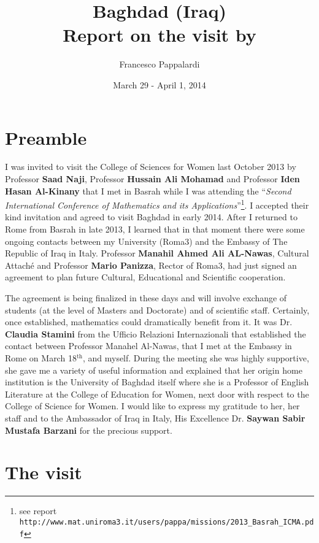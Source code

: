 \documentclass[12pt,a4paper]{scrartcl}
\title{Baghdad (Iraq)\\ Report on the visit by}
\author{Francesco Pappalardi}
\date{March 29 - April 1, 2014}
\begin{document}
\maketitle


\section{Preamble}

I was invited to visit the College of Sciences for Women last October 2013 by 
Professor \textbf{Saad Naji}, Professor \textbf{Hussain Ali Mohamad} and 
Professor \textbf{Iden Hasan Al-Kinany} that I met in Basrah
while I was attending the ``\textsl{Second International Conference 
of Mathematics and its Applications}''\footnote{see report \texttt{http://www.mat.uniroma3.it/users/pappa/missions/2013\_Basrah\_ICMA.pdf}}. 
 I accepted their kind invitation and agreed to visit Baghdad in early 2014. After I returned to 
Rome from Basrah in late 2013, I learned  that in that moment there were some ongoing contacts between my University (Roma3) and the 
Embassy of The Republic of Iraq in Italy. Professor \textbf{Manahil Ahmed Ali AL-Nawas}, Cultural Attach\'e and Professor \textbf{Mario Panizza}, Rector of
Roma3,
had just signed an agreement to plan future Cultural, Educational and Scientific cooperation.  

The agreement is being finalized in these days and will involve exchange of students (at the level of Masters and Doctorate) and of scientific staff.  
Certainly, once established, mathematics could dramatically benefit from it. 
It was Dr. \textbf{Claudia Stamini}
from the Ufficio Relazioni Internazionali that established the contact between Professor Manahel Al-Nawas, that I met at the Embassy
in Rome on March 18$^{\textrm{th}}$, and myself. During the meeting she was highly supportive, she gave me a variety of useful information and explained that her
origin home institution is the University of Baghdad itself where she is a Professor of English Literature at the College of Education for Women, next door with respect
to the College of Science for Women. I would like to express my gratitude to her, her staff and to the Ambassador of Iraq in Italy, His
Excellence Dr. \textbf{Saywan Sabir Mustafa Barzani} for the 
precious support.

\section{The visit}
\end{document}

